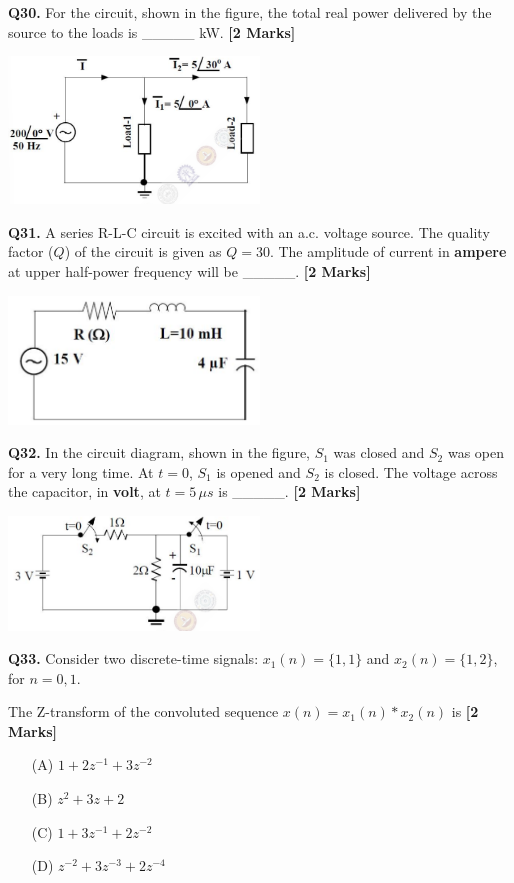 \documentclass[11pt]{article}
\newcommand{\questionb}[2]{
    \noindent\textbf{Q#2.} #1 \hfill \textbf{[2 Marks]}
}
\begin{document}
\questionb{For the circuit, shown in the figure, the total real power delivered by the source to the loads is \_\_\_\_\_ kW.}{30}
\begin{center}
\includegraphics[width=0.5\textwidth]{figures/30.png}
\end{center}
\vspace{0.5cm}

\questionb{A series R-L-C circuit is excited with an a.c. voltage source. The quality factor (\(Q\)) of the circuit is given as \( Q = 30 \). The amplitude of current in \textbf{ampere} at upper half-power frequency will be \_\_\_\_\_.}{31}
\begin{center}
\includegraphics[width=0.5\textwidth]{figures/31.png}
\end{center}
\vspace{0.5cm}

\questionb{In the circuit diagram, shown in the figure, \( S_1 \) was closed and \( S_2 \) was open for a very long time. At \( t = 0 \), \( S_1 \) is opened and \( S_2 \) is closed. The voltage across the capacitor, in \textbf{volt}, at \( t = 5 \, \mu s \) is \_\_\_\_\_.}{32}
\begin{center}
\includegraphics[width=0.5\textwidth]{figures/32.png}
\end{center}
\vspace{0.5cm}

\questionb{Consider two discrete-time signals:  
\( x_1(n) = \{1, 1\} \) and \( x_2(n) = \{1, 2\} \), for \( n = 0, 1 \).  

The Z-transform of the convoluted sequence \( x(n) = x_1(n) * x_2(n) \) is}{33}
\begin{enumerate}
    \item[(A)] \( 1 + 2z^{-1} + 3z^{-2} \)  
    \item[(B)] \( z^2 + 3z + 2 \)  
    \item[(C)] \( 1 + 3z^{-1} + 2z^{-2} \)  
    \item[(D)] \( z^{-2} + 3z^{-3} + 2z^{-4} \)
\end{enumerate}
\vspace{0.5cm}
\end{document}
